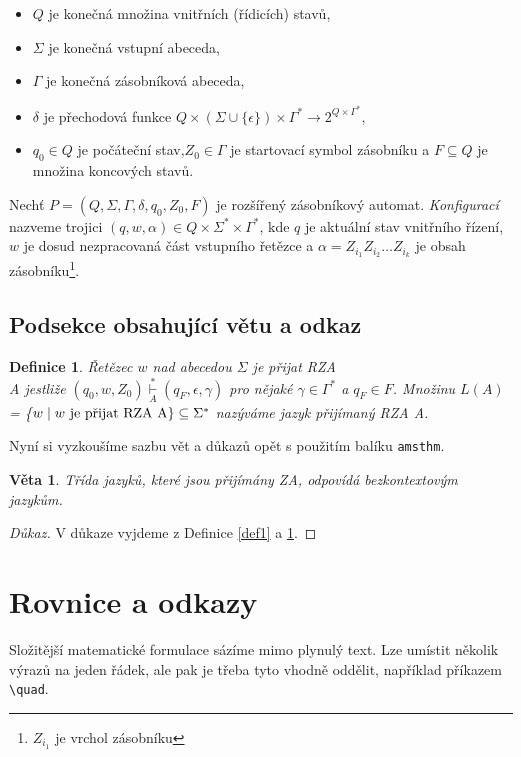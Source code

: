 \documentclass[11pt,a4paper,twocolumn]{article}
\newtheorem{remark}{Věta}
\newtheorem{definition}{Definice}
\begin{document}
\renewcommand\labelitemi{$\bullet$}
\begin{itemize}
\item $Q$ je konečná množina vnitřních (řídicích) stavů,
\item $\Sigma$ je konečná vstupní abeceda,
\item $\Gamma$ je konečná zásobníková abeceda,
\item $\delta$ je přechodová funkce $Q \times (\Sigma \cup \{\epsilon\})\times\Gamma^* \to 2^{Q\times\Gamma^*}$,
\item $q_0 \in Q$ je počáteční stav,$Z_0 \in \Gamma$ je startovací symbol zásobníku a $F \subseteq Q$ je množina koncových stavů.
\end{itemize}\par
Nechť $P = (Q,\Sigma,\Gamma,\delta,q_0,Z_0,F)$ je rozšířený zásobníkový automat. \textit{Konfigurací} nazveme trojici $(q, w, \alpha) \in Q \times \Sigma^* \times \Gamma^*$, kde $q$ je aktuální stav vnitřního řízení, $w$ je dosud nezpracovaná část vstupního řetězce a $\alpha = Z_{i_{1}} Z_{i_{2}}\dotso Z_{i_{k}}$ je obsah zásobníku\footnote{$Z_{i_{1}}$ je vrchol zásobníku}.

\subsection{Podsekce obsahující větu a odkaz}

\begin{definition}\label{def2}
\textnormal{Řetězec $w$ nad abecedou $\Sigma$ je přijat RZA}\\A jestliže $(q_0,w,Z_0) \stackrel*{\underset{A}{\vdash}}  (q_F, \epsilon, \gamma)$ pro nějaké $\gamma \in \Gamma^*$ a $q_F \in F$. Množinu $L(A)$ = \{$w \mid w \text{ je přijat RZA A\}} \subseteq \\ \Sigma^*$ nazýváme \textnormal{jazyk přijímaný RZA} A.
\end{definition}

Nyní si vyzkoušíme sazbu vět a důkazů opět s použitím
balíku \texttt{amsthm}.

\begin{remark}\label{veta1}
Třída jazyků, které jsou přijímány ZA, \textnormal{odpovídá bezkontextovým jazykům.}

\end{remark}
\begin{proof}[Důkaz]\label{duk1}
V důkaze vyjdeme z Definice \ref{def1} a \ref{def2}.
\end{proof}

\section{Rovnice a odkazy}
Složitější matematické formulace sázíme mimo plynulý text. Lze umístit několik výrazů na jeden řádek, ale pak je třeba tyto vhodně oddělit, například příkazem \verb|\quad|.
\par
\end{document}
